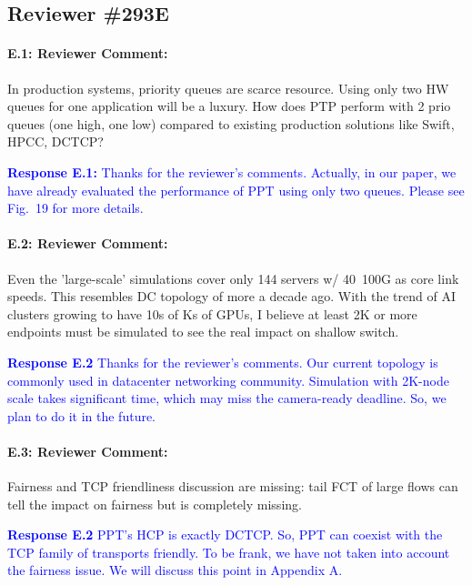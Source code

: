 \documentclass[12pt,one-column]{article}
\begin{document}
\subsection{Reviewer \#293E}

{\it \paragraph{E.1: Reviewer Comment:} In production systems, priority queues are scarce resource. Using only two HW queues for one application will be a luxury. How does PTP perform with 2 prio queues (one high, one low) compared to existing production solutions like Swift, HPCC, DCTCP?}

\noindent\textcolor{blue}{\textbf{Response E.1:}
Thanks for the reviewer’s comments. 
Actually, in our paper, we have already evaluated the performance of PPT using only two queues. Please see Fig.~19 for more details.
}

{\it \paragraph{E.2: Reviewer Comment:} Even the 'large-scale' simulations cover only 144 servers w/ 40~100G as core link speeds. This resembles DC topology of more a decade ago. With the trend of AI clusters growing to have 10s of Ks of GPUs, I believe at least 2K or more endpoints must be simulated to see the real impact on shallow switch.}

\noindent\textcolor{blue}{\textbf{Response E.2}
Thanks for the reviewer’s comments. 
Our current topology is commonly used in datacenter networking community.
Simulation with 2K-node scale takes significant time, which may miss the camera-ready deadline.  So, we plan to do it in the future.
} 

{\it \paragraph{E.3: Reviewer Comment:} Fairness and TCP friendliness discussion are missing: tail FCT of large flows can tell the impact on fairness but is completely missing.}

\noindent\textcolor{blue}{\textbf{Response E.2}
PPT's HCP is exactly DCTCP. So, PPT can coexist with the TCP family of transports friendly.
To be frank, we have not taken into account the fairness issue.
We will discuss this point in Appendix A.
} 






%
%
\end{document}
